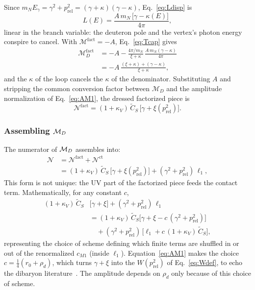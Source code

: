 \documentclass[
  aps,prd,twocolumn,nofootinbib,superscriptaddress,
  longbibliography,floatfix,preprintnumbers
]{revtex4-2}
\newcommand{\prel}{p_{\mathrm{rel}}}
\newcommand{\Egam}{E_{\gamma}}
\newcommand{\kappaV}{\kappa_{V}}
\newcommand{\Mone}{M1}
\newcommand{\CSv}{\tilde{C}_{S}}
\begin{document}
Since $m_{N}\Egam = \gamma^{2}+\prel^{2}  = (\gamma+\kappa)(\gamma-\kappa)$, Eq.~\eqref{eq:Ldisp} is
\begin{equation}
  L(E) = \frac{A\,m_{N}\,\big[\gamma-\kappa(E)\big]}{4\pi},
  \label{eq:Ltri}
\end{equation}
linear in the branch variable: the deuteron pole and the vertex's photon
energy conspire to cancel. With $\mathcal{M}^{\mathrm{fact}}=-A$, Eq.~\eqref{eq:Tcap} gives
\begin{equation}
\begin{split}
  \mathcal{M}_{D}^{\mathrm{fact}}
  &= -A - \frac{4\pi/m_{N}}{\xi+\kappa}\,
    \frac{A\,m_{N}(\gamma-\kappa)}{4\pi}\\
  &= -A\,\frac{(\xi+\kappa)+(\gamma-\kappa)}{\xi+\kappa},
\end{split}
  \label{eq:assemble}
\end{equation}
and the $\kappa$ of the loop cancels the $\kappa$ of the denominator.
Substituting $A$ and stripping the common conversion factor between
$\mathcal{M}_{D}$ and the amplitude normalization of Eq.~\eqref{eq:AM1}, the
dressed factorized piece is
\begin{equation}
  \mathcal{N}^{\mathrm{fact}} = (1+\kappaV)\,\CSv\,\big[\gamma+\xi(\prel^{2})\big].
  \label{eq:Rimp}
\end{equation}

\subsubsection{Assembling ${\cal M}_D$}

The numerator of ${\cal M}_D$ assembles into:
\begin{equation}
\begin{split}
  \mathcal{N} &= \mathcal{N}^{\mathrm{fact}} + \mathcal{N}^{\mathrm{ct}}\\
  &= (1+\kappaV)\,\CSv\,\big[\gamma+\xi(\prel^{2})\big]
   + (\gamma^{2}+\prel^{2})\,\ell_{1},
\end{split}
  \label{eq:Nsum}
\end{equation}
This form is not unique: the UV part of the factorized piece feeds the contact term.  Mathematically, for any constant $c$,
\begin{equation}
\begin{split}
  (1+\kappaV)\,\CSv&\big[\gamma+\xi\big] + (\gamma^{2}+\prel^{2})\,\ell_{1}\\
  &= (1+\kappaV)\,\CSv\big[\gamma+\xi - c\,(\gamma^{2}+\prel^{2})\big]\\
  &\quad + (\gamma^{2}+\prel^{2})\,\big[\ell_{1}+c\,(1+\kappaV)\,\CSv\big],
\end{split}
  \label{eq:shuffle}
\end{equation}
representing the choice of scheme defining which finite terms are shuffled in or out of the renormalized $c_{\Mone}$ (inside $\ell_1$).
Equation~\eqref{eq:AM1} makes the
choice $c=\tfrac14(r_{0}+\rho_{d})$, which turns $\gamma+\xi$ into
the $W(\prel^{2})$ of Eq.~\eqref{eq:Wdef}, to echo the dibaryon literature~\cite{Ando:2005cz,Rupak:1999rk}.
The amplitude depends on $\rho_{d}$ only because of this choice of scheme.
\end{document}
